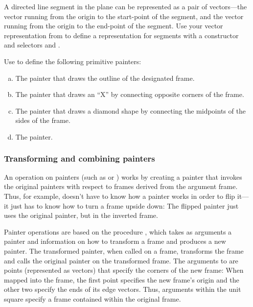 \begin{exerciseGroup}
\label{Exercise 2.48}
 A directed line segment in the
plane can be represented as a pair of vectors---the vector running from the
origin to the start-point of the segment, and the vector running from the
origin to the end-point of the segment.  Use your vector representation from
 to define a representation for segments with a constructor
 and selectors  and .

\label{Exercise 2.49}
 Use 
to define the following primitive painters:

\begin{enumerate}[a.]

\item
The painter that draws the outline of the designated frame.

\item
The painter that draws an ``X'' by connecting opposite corners of the frame.

\item
The painter that draws a diamond shape by connecting the midpoints of the sides
of the frame.

\item
The  painter.

\end{enumerate}
\end{exerciseGroup}

\subsubsection*{Transforming and combining painters}

An operation on painters (such as  or ) works by
creating a painter that invokes the original painters with respect to frames
derived from the argument frame.  Thus, for example,  doesn't
have to know how a painter works in order to flip it---it just has to know how
to turn a frame upside down: The flipped painter just uses the original
painter, but in the inverted frame.

Painter operations are based on the procedure , which
takes as arguments a painter and information on how to transform a frame and
produces a new painter.  The transformed painter, when called on a frame,
transforms the frame and calls the original painter on the transformed frame.
The arguments to  are points (represented as vectors)
that specify the corners of the new frame: When mapped into the frame, the
first point specifies the new frame's origin and the other two specify the ends
of its edge vectors.  Thus, arguments within the unit square specify a frame
contained within the original frame.

